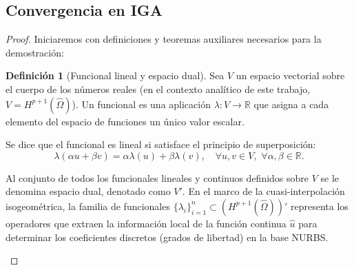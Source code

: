 \documentclass[11pt]{book}
\theoremstyle{plain} %
\theoremstyle{definition} %
\newtheorem*{defin}{Definición} %
\theoremstyle{definition} %
\begin{document}
\subsection{Convergencia en IGA}\label{proof:IGA}
\begin{proof}



    Iniciaremos con definiciones y teoremas auxiliares necesarios para la demostración:
    
    \begin{defin}[Funcional lineal y espacio dual]
        Sea $V$ un espacio vectorial sobre el cuerpo de los números reales (en el contexto analítico de este trabajo, $V = H^{p+1}(\hat{\Omega})$).
        Un funcional es una aplicación $\lambda: V \to \mathbb{R}$ que asigna a cada elemento del espacio de funciones un único valor escalar.
        
        Se dice que el funcional es lineal si satisface el principio de superposición:$$\lambda(\alpha u + \beta v) = \alpha \lambda(u) + \beta \lambda(v), \quad \forall u, v \in V, \,\, \forall \alpha, \beta \in \mathbb{R}.$$
        
        Al conjunto de todos los funcionales lineales y continuos definidos sobre $V$ se le denomina espacio dual,
        denotado como $V'$. En el marco de la cuasi-interpolación isogeométrica, la familia de funcionales
        $\{ \lambda_i \}_{i=1}^n \subset (H^{p+1}(\hat{\Omega}))'$ representa los operadores que extraen la información
        local de la función continua $\hat{u}$ para determinar los coeficientes discretos (grados de libertad) en la base NURBS.
    \end{defin}


\end{proof}
\end{document}
